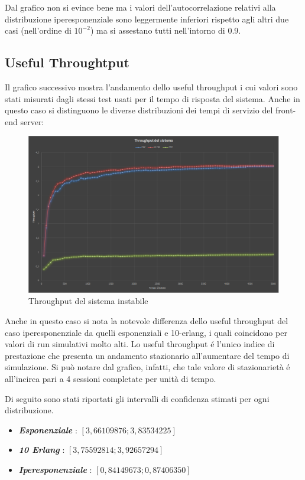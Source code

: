 Dal grafico non si evince bene ma i valori dell'autocorrelazione relativi alla distribuzione
iperesponenziale sono leggermente inferiori rispetto agli altri due casi (nell'ordine di $10^{-2}$)
ma si assestano tutti nell'intorno di 0.9.

\subsection{Useful Throughtput}

Il grafico successivo mostra l'andamento dello useful throughput i cui valori sono stati
misurati dagli stessi test usati per il tempo di risposta del sistema. Anche in questo caso si 
distinguono le diverse distribuzioni dei tempi di servizio del front-end server:

\begin{figure}[H]
 \centering
 \includegraphics[scale=0.45]{img/throughput.png}
 \caption[Throughput del sistema instabile]{Throughput del sistema instabile}
 \label{fig:Throughput del sistema instabile}
\end{figure}

Anche in questo caso si nota la notevole differenza dello useful throughput  del caso 
iperesponenziale da quelli esponenziali e 10-erlang, i quali coincidono per valori di run  
simulativi molto alti.
Lo useful throughput \'e l'unico indice di prestazione che presenta un andamento stazionario 
all'aumentare del tempo di simulazione. Si pu\`o notare dal grafico, infatti, che tale valore di 
stazionariet\`a \'e all'incirca pari a 4 sessioni completate per unit\`a di tempo.


Di seguito sono stati riportati gli intervalli di confidenza stimati per ogni distribuzione. 
\begin{itemize}
 \item \textit{\textbf{Esponenziale}} : $[ 3,66109876 ; 3,83534225 ]$
 \item \textit{\textbf{10 Erlang}} : $[ 3,75592814 ; 3,92657294 ]$
 \item \textit{\textbf{Iperesponenziale}} : $[ 0,84149673 ; 0,87406350 ]$
\end{itemize}

